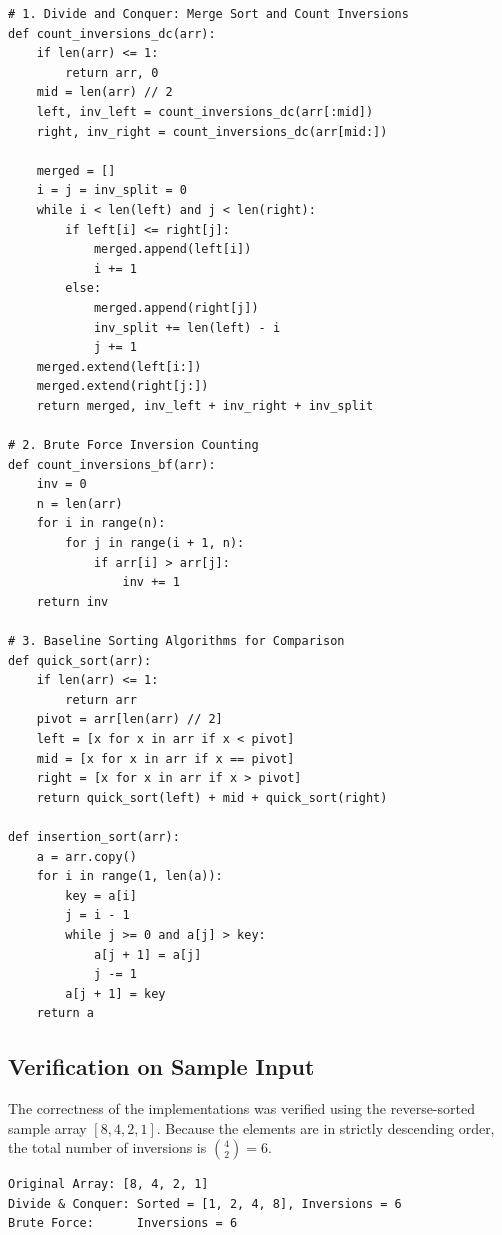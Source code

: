 \documentclass[12pt]{article}
\begin{document}
\begin{lstlisting}[style=code, caption={Problem 1 Algorithm Implementations}]
# 1. Divide and Conquer: Merge Sort and Count Inversions
def count_inversions_dc(arr):
    if len(arr) <= 1:
        return arr, 0
    mid = len(arr) // 2
    left, inv_left = count_inversions_dc(arr[:mid])
    right, inv_right = count_inversions_dc(arr[mid:])
    
    merged = []
    i = j = inv_split = 0
    while i < len(left) and j < len(right):
        if left[i] <= right[j]:
            merged.append(left[i])
            i += 1
        else:
            merged.append(right[j])
            inv_split += len(left) - i
            j += 1
    merged.extend(left[i:])
    merged.extend(right[j:])
    return merged, inv_left + inv_right + inv_split

# 2. Brute Force Inversion Counting
def count_inversions_bf(arr):
    inv = 0
    n = len(arr)
    for i in range(n):
        for j in range(i + 1, n):
            if arr[i] > arr[j]:
                inv += 1
    return inv

# 3. Baseline Sorting Algorithms for Comparison
def quick_sort(arr):
    if len(arr) <= 1:
        return arr
    pivot = arr[len(arr) // 2]
    left = [x for x in arr if x < pivot]
    mid = [x for x in arr if x == pivot]
    right = [x for x in arr if x > pivot]
    return quick_sort(left) + mid + quick_sort(right)

def insertion_sort(arr):
    a = arr.copy()
    for i in range(1, len(a)):
        key = a[i]
        j = i - 1
        while j >= 0 and a[j] > key:
            a[j + 1] = a[j]
            j -= 1
        a[j + 1] = key
    return a
\end{lstlisting}

\subsection{Verification on Sample Input}
The correctness of the implementations was verified using the reverse-sorted sample array $[8, 4, 2, 1]$. Because the elements are in strictly descending order, the total number of inversions is $\binom{4}{2} = 6$.

\begin{lstlisting}[style=output, caption={Console Output for Sample Verification}]
Original Array: [8, 4, 2, 1]
Divide & Conquer: Sorted = [1, 2, 4, 8], Inversions = 6
Brute Force:      Inversions = 6
\end{lstlisting}
\end{document}
